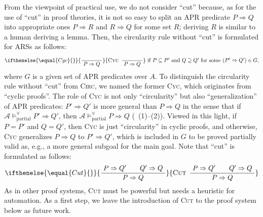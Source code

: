 \documentclass[10pt,a4paper]{article}
\newcommand{\bfnum}[1]{(#1)}
\def\cA{\mathcal{A}}
\newcommand{\ReachPred}[2]{#1 \Rightarrow #2}
\newcommand{\Valid}[3]{#2 \mathrel{\mathrel{\models^\forall_{\mathrm{#1}}}} #3}
\newcommand{\PartiallyValid}[2][\cA]{\Valid{partial}{#1}{#2}}
\newcommand{\RuleName}[1]{{\rm \textsc{#1}}}
\newcommand{\InfRule}[3][]{\ifthenelse{\equal{#1}{}}{\displaystyle\frac{~ #2 ~}{~ #3 ~}}{\mbox{\rm\RuleName{#1}} ~\, \displaystyle\frac{~ #2 ~}{~ #3 ~}
}}
\begin{document}
From the viewpoint of practical use, we do not consider ``cut'' because, as for the use of ``cut'' in proof theories, it is not so easy to split an APR predicate $\ReachPred{P}{Q}$ into appropriate ones $\ReachPred{P}{R}$ and $\ReachPred{R}{Q}$ for some set $R$;
deriving $R$ is similar to a human deriving a lemma.
Then, the circularity rule without ``cut'' is formulated for ARSs as follows:
\[
	\InfRule[Cyc]{}{\ReachPred{P}{Q}
	}
	~\mbox{if $P \subseteq P'$ and $Q \supseteq Q'$ for some $(\ReachPred{P'}{Q'}) \in G$,}
\]
where $G$ is a given set of APR predicates over $A$.
To distinguish the circularity rule without ``cut'' from \RuleName{Circ}, we named the former \RuleName{Cyc}, which originates from ``cyclic proofs''.
The role of \RuleName{Cyc} is not only ``circularity'' but also ``generalization'' of APR predicates:
$\ReachPred{P'}{Q'}$ is more general than $\ReachPred{P}{Q}$
in the sense that
if
$\PartiallyValid{\ReachPred{P'}{Q'}}$,
then
$\PartiallyValid{\ReachPred{P}{Q}}$
(~\bfnum{1}--\bfnum{2}).
Viewed in this light,
if $P=P'$ and $Q=Q'$, then \RuleName{Cyc} is just ``circularity'' in cyclic proofs,
and
otherwise, \RuleName{Cyc} generalizes $\ReachPred{P}{Q}$ to $\ReachPred{P'}{Q'}$, which is included in $G$ to be proved partially valid as, e.g., a more general subgoal for the main goal.
Note that ``cut'' is formulated as follows:
\[
	\InfRule[Cut]{\ReachPred{P}{Q'}
		\qquad
		\ReachPred{Q'}{Q}
	}{\ReachPred{P}{Q}
	}
\]
As in other proof systems, \RuleName{Cut} must be powerful but needs a heuristic for automation.
As a first step, we leave the introduction of \RuleName{Cut} to the proof system below as future work.
\end{document}
